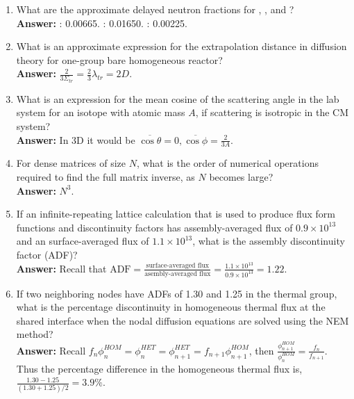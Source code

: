 \documentclass{school-22.211-notes}
\begin{document}
\begin{enumerate}
\begin{enumerate}
  \item What are the approximate delayed neutron fractions for , , and ? \\ 
    \textbf{Answer:} : 0.00665. : 0.01650. : 0.00225. 

  \item What is an approximate expression for the extrapolation distance in diffusion theory for one-group bare homogeneous reactor? \\
    \textbf{Answer:} $\displaystyle \frac{2}{3 \Sigma_{tr}} = \frac{2}{3} \lambda_{tr} = 2D$. 

  \item What is an expression for the mean cosine of the scattering angle in the lab system for an isotope with atomic mass $A$, if scattering is isotropic in the CM system? \\
    \textbf{Answer:} In 3D it would be $\overline{\cos \theta} = 0, \overline{\cos \phi} = \frac{2}{3A}$. 

  \item For dense matrices of size $N$, what is the order of numerical operations required to find the full matrix inverse, as $N$ becomes large? \\
    \textbf{Answer:} $N^3$. 

  \item  If an infinite-repeating lattice calculation that is used to produce flux form functions and discontinuity factors has assembly-averaged flux of $0.9 \times 10^{13}$ and an surface-averaged flux of $1.1 \times 10^{13}$, what is the assembly discontinuity factor (ADF)? \\
    \textbf{Answer:} Recall that $\displaystyle \mathrm{ADF} = \frac{\mbox{surface-averaged flux}}{\mbox{asembly-averaged flux}} = \frac{1.1 \times 10^{13}}{0.9 \times 10^{13}} = 1.22$. 

  \item If two neighboring nodes have ADFs of 1.30 and 1.25 in the thermal group, what is the percentage discontinuity in homogeneous thermal flux at the shared interface when the nodal diffusion equations are solved using the NEM method? \\
    \textbf{Answer:} Recall $\displaystyle f_n \phi_n^{HOM} = \phi_n^{HET} = \phi_{n+1}^{HET} = f_{n+1} \phi_{n+1}^{HOM}$, then $\displaystyle \frac{\phi_{n+1}^{HOM}}{\phi_n^{HOM}} = \frac{f_n}{f_{n+1}}$. Thus the percentage difference in the homogeneous thermal flux is, $\displaystyle \frac{1.30 - 1.25}{(1.30 + 1.25)/2} = 3.9\%$. 
  \end{enumerate}


\end{enumerate}
\end{document}
